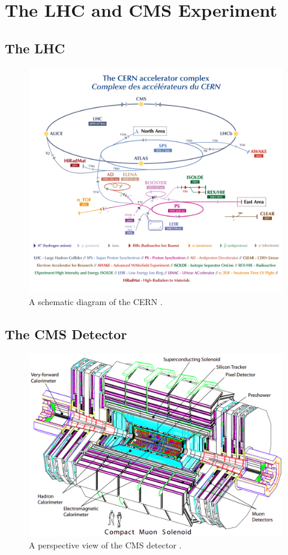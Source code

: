 \chapter{The LHC and CMS Experiment}
\label{sec:cms}

\section{The LHC}

\begin{figure}[H]
    \centering
    \includegraphics[scale=1.2]{Figures/cern.png}
    \caption{A schematic diagram of the CERN  \cite{Bartosik:2847538}.}
    \label{fig:CMS_Schematic}
\end{figure}

\section{The CMS Detector}

\begin{figure}[H]
    \centering
    \includegraphics[scale=0.4]{Figures/CMS_Detector.png}
    \caption{A perspective view of the CMS detector \cite{CMS_Setup}.}
    \label{fig:CMS_Schematic}
\end{figure}

